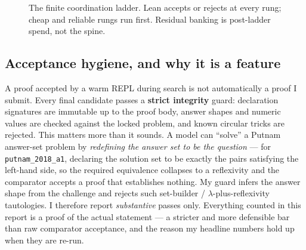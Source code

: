 \begin{figure}[h]
\centering
{}
\caption{The finite coordination ladder. Lean accepts or rejects at every rung;
cheap and reliable rungs run first. Residual banking is post-ladder spend, not
the spine.}
\label{fig:ladder}
\end{figure}

\subsection{Acceptance hygiene, and why it is a feature}
A proof accepted by a warm REPL during search is not automatically a proof I
submit. Every final candidate passes a \textbf{strict integrity} guard:
declaration signatures are immutable up to the proof body, answer shapes and
numeric values are checked against the locked problem, and known circular tricks
are rejected. This matters more than it sounds. A model can ``solve'' a Putnam
answer-set problem by \emph{redefining the answer set to be the question} --- for
\texttt{putnam\_2018\_a1}, declaring the solution set to be exactly the pairs
satisfying the left-hand side, so the required equivalence collapses to a
reflexivity and the comparator accepts a proof that establishes nothing. My guard
infers the answer shape from the challenge and rejects such
set-builder / $\lambda$-plus-reflexivity tautologies. I therefore report
\emph{substantive} passes only. Everything counted in this report is a proof of
the actual statement --- a stricter and more defensible bar than raw comparator
acceptance, and the reason my headline numbers hold up when they are re-run.
